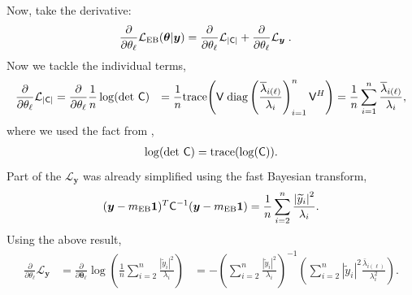 \documentclass{svjour3}                     %
\newcommand{\bm}[1]{\boldsymbol{#1}}
\newcommand{\trace}[1]{\textup{trace}{#1}}
\newcommand{\vtheta}{{\bm{\theta}}}
\newcommand{\vy}{\bm{y}}
\newcommand{\vone}{\bm{1}}
\newcommand{\mC}{\mathsf{C}}
\newcommand{\mCInv}{\mathsf{C}^{-1}}
\newcommand{\mLambda}{\mathsf{\Lambda}}
\newcommand{\mV}{\mathsf{V}}
\newcommand{\MLE}{\textup{EB}}
\newcommand{\diag}{\text{diag}}
\def\abs#1{\ensuremath{\left \lvert #1 \right \rvert}}
\begin{document}
Now, take the derivative:
\begin{align*}
\frac{\partial}{\partial \theta_\ell} \mathcal{L}_{\MLE}(\vtheta | \vy)
&=  \frac{\partial}{\partial \theta_\ell} \mathcal{L}_{\abs{\mC}} + \frac{\partial}{\partial \theta_\ell} \mathcal{L}_{\vy} \;.
\end{align*}
Now we tackle the individual terms,
\begin{align*}
\frac{\partial}{\partial \theta_\ell} \mathcal{L}_{\abs{\mC}} &= \frac{\partial}{\partial \theta_\ell}  \frac{1}{n} \log(\det\, \mC) 
& =\frac{1}{n}
\trace{\left(
	\mV \;
	\diag\left( \frac{\overline{\lambda}_{i(\ell)}}{\lambda_i} \right)_{i=1}^n \mV^H
	\right)}
= \frac{1}{n} \sum_{i=1}^{n} \frac{\overline{\lambda}_{i(\ell)}}{\lambda_i},
\end{align*}
where we used the fact from \cite{Hig08},
\begin{align*}
\log(\det\, \mC)  = \trace{ (\log( \mC)) }.
\end{align*}
Part of the $\mathcal{L}_{\vy}$ was already simplified using the fast Bayesian transform,
\begin{align*}
{(\vy-m_\MLE\vone)^T\mCInv(\vy-m_\MLE\vone)} = \frac{1}{n} \sum_{i=2}^n \frac{\abs{\widetilde{y}_i}^2}{\lambda_i}.
\end{align*}
Using the above result,
\begin{align*}
\frac{\partial}{\partial \theta_\ell} \mathcal{L}_{\vy} 
&= \frac{\partial}{\partial \vtheta_\ell} \log\left(\frac{1}{n} \sum_{i=2}^n \frac{\abs{\widetilde{y}_i}^2}{\lambda_i} \right)
&= -\left(
\sum_{i=2}^n \frac{\abs{\widetilde{y}_i}^2}{\lambda_i} \right)^{-1} 
\left( \sum_{i=2}^n \abs{\widetilde{y}_i}^2 \frac{ \bar{ \lambda}_{i(\ell)} }{\lambda_i^2}
\right).
\end{align*}
\end{document}
